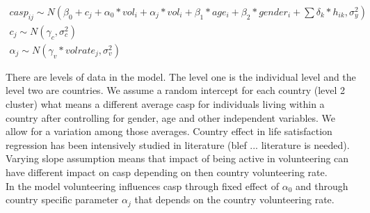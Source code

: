 \documentclass[10pt, letterpaper]{article}
\begin{document}
\begin{spacing}{1.4}
%
%	 
%
%

 \begin{eqnarray}
	casp_{ij}\sim N(\beta_{0}+c_{j}+ \alpha_{0}* vol_{i} + \alpha_{j} * vol_{i}+\beta_{1}*age_{i}+\beta_{2}*gender_{i}+\sum \delta_k*h_{ik},\sigma^{2}_{y}) \\
	c_{j} \sim N(\gamma_{c},\sigma^{2}_{c}) \\
	\alpha_{j} \sim N(\gamma_{v}*volrate_{j},\sigma^{2}_{v})
 \end{eqnarray}

There are levels of data in the model. The level one is the individual level and the level two are countries. We assume a random intercept for each country (level 2 cluster) what means a different average casp for individuals living within a country after controlling for gender, age and other independent variables. We allow for a variation among those averages. Country effect in life satisfaction regression has been intensively studied in literature (blef ... literature is needed). Varying slope assumption means that impact of being active in volunteering can have different impact on casp depending on then country volunteering rate. \\

In the model volunteering influences casp through fixed effect of  $\alpha_{0}$ and through country specific parameter $\alpha_{j}$ that depends on the country volunteering rate. 


\end{spacing}
\end{document}
